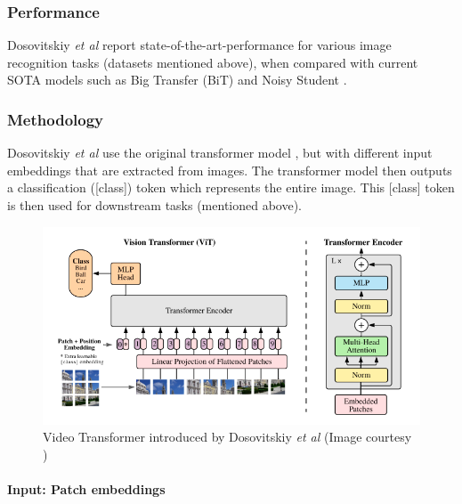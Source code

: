 \subsubsection{Performance}
\par Dosovitskiy \textit{et al} report state-of-the-art-performance for various image recognition tasks (datasets mentioned above), when compared with current SOTA models such as Big Transfer (BiT) \cite{bit} and Noisy Student \cite{nos}.\par


\subsubsection{Methodology}

\par Dosovitskiy \textit{et al} use the original transformer model \cite{tfm}, but with different input embeddings that are extracted from images. The transformer model then outputs a classification ([class]) token which represents the entire image. This [class] token is then used for downstream tasks (mentioned above).\par

\begin{figure}[h]
	\includegraphics[width=\linewidth]{assets/img/vit.png}
	\caption{Video Transformer introduced by Dosovitskiy \textit{et al} (Image courtesy \cite{vit})}
\end{figure}


\paragraph{Input: Patch embeddings}

